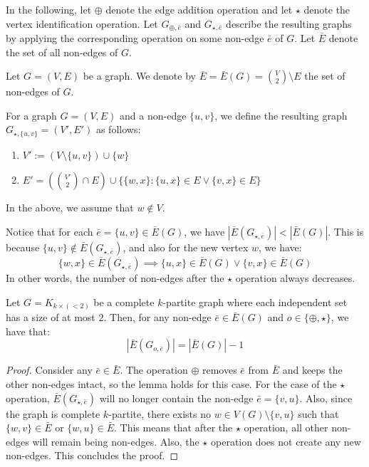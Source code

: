 In the following, let $\oplus$ denote the edge addition operation and let $\star$ denote the vertex identification operation. Let $G_{\oplus,\bar{e}}$ and $G_{\star,\bar{e}}$ describe the resulting graphs by applying the corresponding operation on some non-edge $\bar{e}$ of $G$. Let $\bar{E}$ denote the set of all non-edges of $G$.
\begin{defn}
    Let $G=(V,E)$ be a graph. We denote by $\bar{E} = \bar{E}(G) = \binom{V}{2} \setminus E$ the set of non-edges of $G$.
\end{defn}

\begin{defn}
    For a graph $G=(V,E)$ and a non-edge $\{u,v\}$, we define the resulting graph $G_{\star,\{u,v\}} = (V',E')$ as follows:
    \begin{enumerate}
        \item $V' := (V \setminus \{u,v\}) \cup \{w\}$
        \item $E' = (\binom{V'}{2} \cap E) \cup \{\{w,x\} : \{u,x\} \in E \vee \{v,x\} \in E\}$
    \end{enumerate}
    In the above, we assume that $w \notin V$.
\end{defn}

Notice that for each $\bar{e} = \{u,v\} \in \bar{E}(G)$, we have $|\bar{E}(G_{\star,\bar{e}})| < |\bar{E}(G)|$. This is because $\{u,v\} \notin \bar{E}(G_{\star,\bar{e}})$, and also for the new vertex $w$, we have: 
\[
\{w,x\} \in \bar{E}(G_{\star,\bar{e}}) \implies \{u,x\} \in \bar{E}(G) \vee \{v,x\} \in \bar{E}(G)
\]
In other words, the number of non-edges after the $\star$ operation always decreases.

\begin{lemma}
\label{lemma:non-edge_set_size}
    Let $G = K_{k \times (<2)}$ be a complete $k$-partite graph where each independent set has a size of at most $2$. Then, for any non-edge $\bar{e} \in \bar{E}(G)$ and $o \in \{\oplus,\star\}$, we have that: 
    \[
    |\bar{E}(G_{o,\bar{e}})| = |\bar{E}(G)| - 1
    \]
\end{lemma}

\begin{proof}
    Consider any $\bar{e} \in \bar{E}$. The operation $\oplus$ removes $\bar{e}$ from $\bar{E}$ and keeps the other non-edges intact, so the lemma holds for this case. For the case of the $\star$ operation, $\bar{E}(G_{\star,\bar{e}})$ will no longer contain the non-edge $\bar{e} = \{v,u\}$. Also, since the graph is complete $k$-partite, there exists no $w \in V(G) \setminus \{v,u\}$ such that $\{w,v\} \in \bar{E}$ or $\{w,u\} \in \bar{E}$. This means that after the $\star$ operation, all other non-edges will remain being non-edges. Also, the $\star$ operation does not create any new non-edges. This concludes the proof.
\end{proof}

